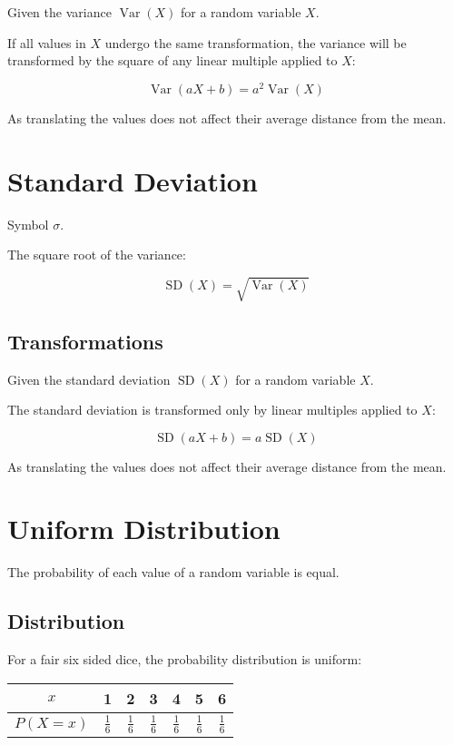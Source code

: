 \documentclass[a4paper,11pt]{article}
\DeclareMathOperator\Var{Var}
\DeclareMathOperator\SD{SD}
\begin{document}
Given the variance $\Var(X)$ for a random variable $X$.

If all values in $X$ undergo the same transformation, the variance will be
transformed by the square of any linear multiple applied to $X$:

$$
\Var(aX + b) = a^2 \Var(X)
$$

As translating the values does not affect their average distance from the mean.




\section{Standard Deviation}

Symbol $\sigma$.

The square root of the variance:

$$
\SD(X) = \sqrt{\Var(X)}
$$


\subsection{Transformations}

Given the standard deviation $\SD(X)$ for a random variable $X$.

The standard deviation is transformed only by linear multiples applied to $X$:

$$
\SD(aX + b) = a \SD(X)
$$

As translating the values does not affect their average distance from the mean.




\section{Uniform Distribution}

The probability of each value of a random variable is equal.


\subsection{Distribution}

For a fair six sided dice, the probability distribution is uniform:

\begin{center}
\begin{tabular}{c|c|c|c|c|c|c}
$x$ & 1 & 2 & 3 & 4 & 5 & 6 \\
\hline
$P(X = x)$ & $\frac{1}{6}$ & $\frac{1}{6}$ & $\frac{1}{6}$ & $\frac{1}{6}$ & $\frac{1}{6}$ & $\frac{1}{6}$ \\
\end{tabular}
\end{center}
\end{document}
